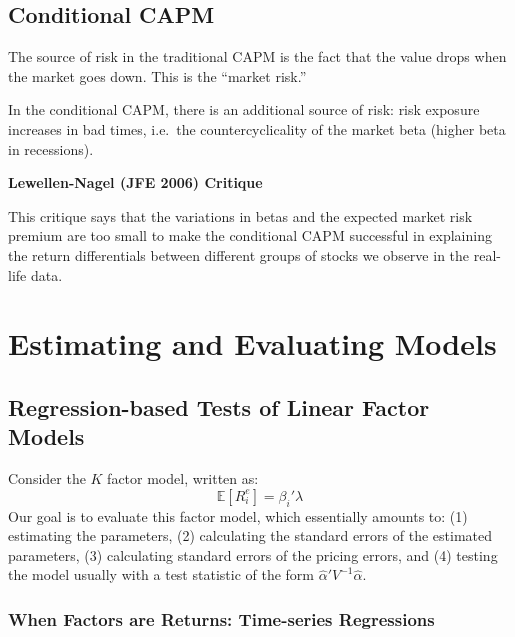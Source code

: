 \documentclass[
]{book}
\begin{document}
\hypertarget{conditional-capm}{%
\section{Conditional CAPM}\label{conditional-capm}}

The source of risk in the traditional CAPM is the fact that the value drops when the market goes down. This is the ``market risk.''

In the conditional CAPM, there is an additional source of risk: risk exposure increases in bad times, i.e.~the countercyclicality of the market beta (higher beta in recessions).

\textbf{Lewellen-Nagel (JFE 2006) Critique}

This critique says that the variations in betas and the expected market risk premium are too small to make the conditional CAPM successful in explaining the return differentials between different groups of stocks we observe in the real-life data.

\hypertarget{estimating-and-evaluating-models}{%
\chapter{Estimating and Evaluating Models}\label{estimating-and-evaluating-models}}

\hypertarget{regression-based-tests-of-linear-factor-models}{%
\section{Regression-based Tests of Linear Factor Models}\label{regression-based-tests-of-linear-factor-models}}

Consider the \(K\) factor model, written as:
\[
\mathbb{E}[R^e_i]=\beta_i'\lambda
\]
Our goal is to evaluate this factor model, which essentially amounts to: (1) estimating the parameters, (2) calculating the standard errors of the estimated parameters, (3) calculating standard errors of the pricing errors, and (4) testing the model usually with a test statistic of the form \(\hat{\alpha}'V^{-1}\hat{\alpha}\).

\hypertarget{when-factors-are-returns-time-series-regressions}{%
\subsection{When Factors are Returns: Time-series Regressions}\label{when-factors-are-returns-time-series-regressions}}
\end{document}
